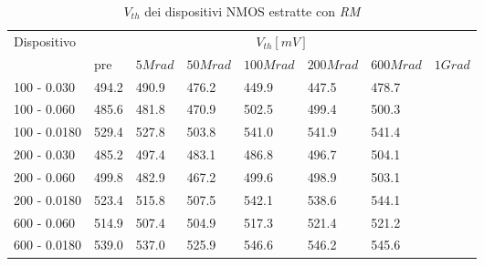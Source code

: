 \documentclass[
	a4paper,
	cleardoublepage=empty,
	headings=twolinechapter,
	numbers=autoenddot,
]{scrbook}
\begin{document}
\begin{table}[H]
  \renewcommand{\arraystretch}{1.3}
  \begin{tabular}{m{2.1cm} m{0.8cm} m{1.1cm} m{1.3cm} m{1.5cm} m{1.5cm} m{1.5cm} m{1cm}}
    \toprule
    \multirow{2}{*}{Dispositivo} & \multicolumn{7}{c}{$V_{th} [mV] $}                                                                    \\
    \cmidrule{2-8}
                                 & pre                                & $5Mrad$ & $50Mrad$ & $100Mrad$ & $200Mrad$ & $600Mrad$ & $1Grad$ \\
    \midrule
    100 - 0.030                     & 494.2                              & 490.9   & 476.2    & 449.9     & 447.5     & 478.7     &         \\
    \hline
    100 - 0.060                     & 485.6                              & 481.8   & 470.9    & 502.5     & 499.4     & 500.3     &         \\
    \hline
    100 - 0.0180                    & 529.4                              & 527.8   & 503.8    & 541.0     & 541.9     & 541.4     &         \\
    \hline
    200 - 0.030                     & 485.2                              & 497.4   & 483.1    & 486.8     & 496.7     & 504.1     &         \\
    \hline
    200 - 0.060                     & 499.8                              & 482.9   & 467.2    & 499.6     & 498.9     & 503.1     &         \\
    \hline
    200 - 0.0180                    & 523.4                              & 515.8   & 507.5    & 542.1     & 538.6     & 544.1     &         \\
    \hline
    600 - 0.060                     & 514.9                              & 507.4   & 504.9    & 517.3     & 521.4     & 521.2     &         \\
    \hline
    600 - 0.0180                    & 539.0                              & 537.0   & 525.9    & 546.6     & 546.2     & 545.6     &         \\
    \bottomrule
  \end{tabular}
  \caption{$V_{th}$ dei dispositivi NMOS estratte con \emph{RM}}
  \label{tab:VthRMN}
\end{table}
\end{document}
